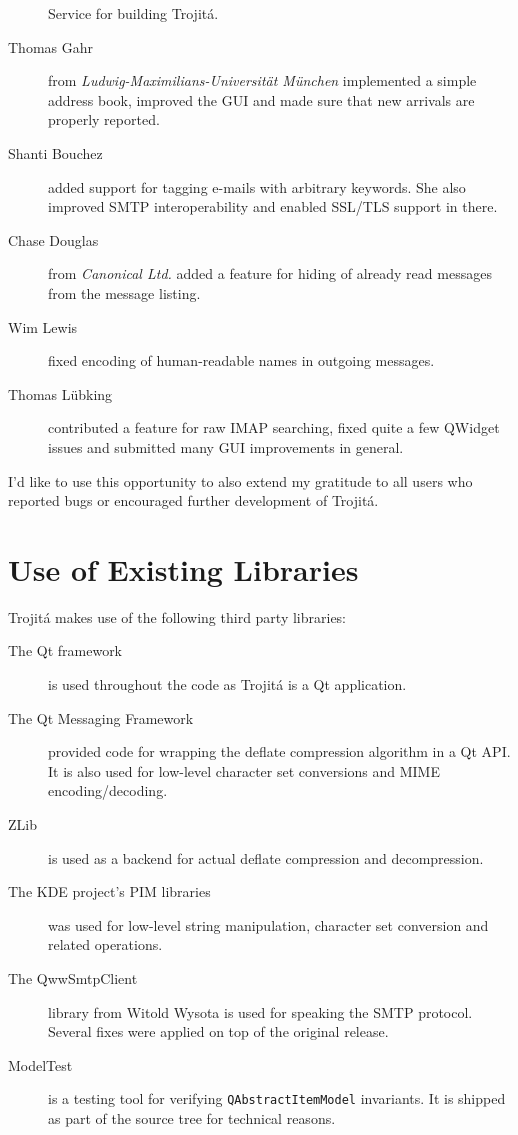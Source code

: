 \documentclass[trojita]{subfiles}
\begin{document}
\begin{description}
    Service for building Trojitá.
  \item[Thomas Gahr] from {\em Ludwig-Maximilians-Universität München} implemented a simple address book, improved the
    GUI and made sure that new arrivals are properly reported.
  \item[Shanti Bouchez] added support for tagging e-mails with arbitrary keywords.  She also improved SMTP
    interoperability and enabled SSL/TLS support in there.
  \item[Chase Douglas] from {\em Canonical Ltd.} added a feature for hiding of already read messages from the message
    listing.
  \item[Wim Lewis] fixed encoding of human-readable names in outgoing messages.
  \item[Thomas Lübking] contributed a feature for raw IMAP searching, fixed quite a few QWidget issues and submitted
    many GUI improvements in general.
\end{description}

I'd like to use this opportunity to also extend my gratitude to all users who reported bugs or encouraged further
development of Trojitá.

\newpage
\section{Use of Existing Libraries}

Trojitá makes use of the following third party libraries:

\begin{description}
  \item[The Qt framework] is used throughout the code as Trojitá is a Qt application.
  \item[The Qt Messaging Framework] provided code for wrapping the deflate compression algorithm in a Qt API.  It is
    also used for low-level character set conversions and MIME encoding/decoding.
  \item[ZLib] is used as a backend for actual deflate compression and decompression.
  \item[The KDE project's PIM libraries] was used for low-level string manipulation, character set conversion and
    related operations.
  \item[The QwwSmtpClient] library from Witold Wysota is used for speaking the SMTP protocol.  Several fixes were
    applied on top of the original release.
  \item[ModelTest] is a testing tool for verifying {\tt QAbstractItemModel} invariants. It is shipped as part of the
    source tree for technical reasons.
\end{description}
\end{document}
